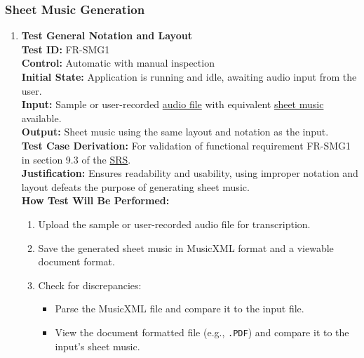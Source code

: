 \documentclass[12pt, titlepage]{article}
\begin{document}
  \subsubsection{Sheet Music Generation}
  \label{FR-SMG}
  \begin{enumerate}
  \item \textbf{Test General Notation and Layout} \\
    \newline
    \textbf{Test ID:} FR-SMG1 \\
    \textbf{Control:} Automatic with manual inspection \\
    \textbf{Initial State:} Application is running and idle, awaiting audio input from the user. \\
    \textbf{Input:} Sample or user-recorded \href{https://github.com/emilyperica/ScoreGen/blob/main/test/TestingDatasets/piano-samples/sample-scales/c-major-scale-on-treble-clef.wav}{audio file} with equivalent \href{https://github.com/emilyperica/ScoreGen/blob/main/test/TestingDatasets/piano-samples/sample-scales/c-major-scale-on-treble-clef.pdf}{sheet music} available. \\
    \textbf{Output:} Sheet music using the same layout and notation as the input. \\
    \textbf{Test Case Derivation:} For validation of functional requirement FR-SMG1 in section 9.3 of the 
    \href{https://github.com/emilyperica/ScoreGen/blob/main/docs/SRS-Volere/SRS.pdf}{SRS}. \\
    \textbf{Justification:} Ensures readability and usability, using improper notation and layout defeats the purpose of 
    generating sheet music. \\
    \textbf{How Test Will Be Performed:}
    \begin{enumerate}
        \item Upload the sample or user-recorded audio file for transcription.
        \item Save the generated sheet music in MusicXML format and a viewable document format.
        \item Check for discrepancies:
        \begin{itemize}
            \item Parse the MusicXML file and compare it to the input file.
            \item View the document formatted file (e.g., \texttt{.PDF}) and compare it to the input’s sheet music.
        \end{itemize}
    \end{enumerate}
  

\end{enumerate}
\end{document}
